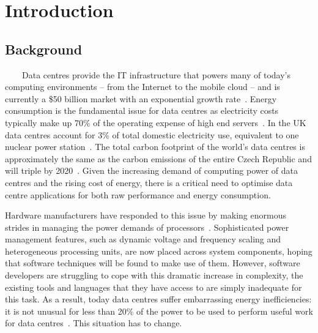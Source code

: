 \section{Introduction}\label{ch:overview}
\subsection{Background}
~~~~Data centres provide the IT infrastructure that powers many of today's computing environments -- from the Internet to the mobile cloud – and is currently a \$50 billion market with an exponential growth rate~\cite{bigdatacentre}. Energy consumption is the fundamental issue for data centres as electricity costs typically make up 70\% of the operating expense of high end servers~\cite{seventy,EPAreport,Energygov}. In the UK data centres account for 3\% of total domestic electricity use, equivalent to one nuclear power station~\cite{globalactionplan}. The total carbon footprint of the world's data centres is approximately the same as the carbon emissions of the entire Czech Republic and will triple by 2020~\cite{GeSI}. Given the increasing demand of computing power of data centres and the rising cost of energy, there is a critical need to optimise data centre applications for both raw performance and energy consumption.

Hardware manufacturers have responded to this issue by making enormous strides in managing the power demands of processors~\cite{chanandopp}. Sophisticated power management features, such as dynamic voltage and frequency scaling and heterogeneous processing units, are now placed across system components, hoping that software techniques will be found to make use of them. However, software developers are struggling to cope with this dramatic increase in complexity, the existing tools and languages that they have access to are simply inadequate for this task. As a result, today data centres suffer embarrassing energy inefficiencies: it is not unusual for less than 20\% of the power to be used to perform useful work for data centres~\cite{thecaseforepc}. This situation has to change.

